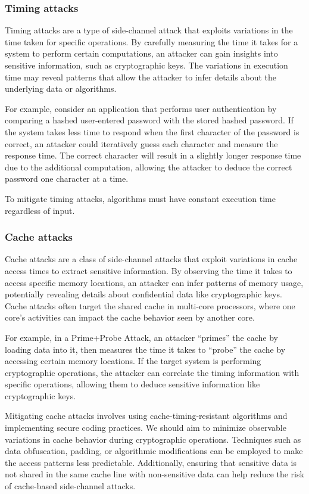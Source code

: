 \documentclass[runningheads]{llncs}
\begin{document}
\subsubsection{Timing attacks}
Timing attacks are a type of side-channel attack that exploits variations in the time taken for specific operations. By carefully measuring the time it takes for a system to perform certain computations, an attacker can gain insights into sensitive information, such as cryptographic keys. The variations in execution time may reveal patterns that allow the attacker to infer details about the underlying data or algorithms.

For example, consider an application that performs user authentication by comparing a hashed user-entered password with the stored hashed password. If the system takes less time to respond when the first character of the password is correct, an attacker could iteratively guess each character and measure the response time. The correct character will result in a slightly longer response time due to the additional computation, allowing the attacker to deduce the correct password one character at a time.

To mitigate timing attacks, algorithms must have constant execution time regardless of input.

\subsubsection{Cache attacks}
Cache attacks are a class of side-channel attacks that exploit variations in cache access times to extract sensitive information. By observing the time it takes to access specific memory locations, an attacker can infer patterns of memory usage, potentially revealing details about confidential data like cryptographic keys. Cache attacks often target the shared cache in multi-core processors, where one core's activities can impact the cache behavior seen by another core.

For example, in a Prime+Probe Attack, an attacker ``primes'' the cache by loading data into it, then measures the time it takes to ``probe'' the cache by accessing certain memory locations. If the target system is performing cryptographic operations, the attacker can correlate the timing information with specific operations, allowing them to deduce sensitive information like cryptographic keys.

Mitigating cache attacks involves using cache-timing-resistant algorithms and implementing secure coding practices. We should aim to minimize observable variations in cache behavior during cryptographic operations. Techniques such as data obfuscation, padding, or algorithmic modifications can be employed to make the access patterns less predictable. Additionally, ensuring that sensitive data is not shared in the same cache line with non-sensitive data can help reduce the risk of cache-based side-channel attacks.
\end{document}
